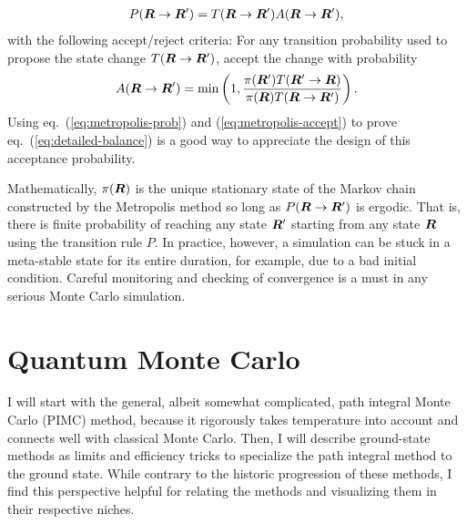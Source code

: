 \begin{align} \label{eq:metropolis-prob}
P(\boldsymbol{R}\rightarrow\boldsymbol{R}') = T(\boldsymbol{R}\rightarrow\boldsymbol{R}')A(\boldsymbol{R}\rightarrow\boldsymbol{R}'),
\end{align}
with the following accept/reject criteria: For any transition probability used to propose the state change $T(\boldsymbol{R}\rightarrow\boldsymbol{R}')$, accept the change with probability
\begin{align} \label{eq:metropolis-accept}
A(\boldsymbol{R}\rightarrow\boldsymbol{R}') = \min\left(1, \dfrac{\pi(\boldsymbol{R}')T(\boldsymbol{R}'\rightarrow\boldsymbol{R})}{\pi(\boldsymbol{R})T(\boldsymbol{R}\rightarrow\boldsymbol{R}')}\right).
\end{align}
Using eq.~(\ref{eq:metropolis-prob}) and (\ref{eq:metropolis-accept}) to prove eq.~(\ref{eq:detailed-balance}) is a good way to appreciate the design of this acceptance probability.

Mathematically, $\pi(\boldsymbol{R})$ is the unique stationary state of the Markov chain constructed by the Metropolis method so long as $P(\boldsymbol{R}\rightarrow\boldsymbol{R}')$ is ergodic. That is, there is finite probability of reaching any state $\boldsymbol{R}'$ starting from any state $\boldsymbol{R}$ using the transition rule $P$.
In practice, however, a simulation can be stuck in a meta-stable state for its entire duration, for example, due to a bad initial condition. Careful monitoring and checking of convergence is a must in any serious Monte Carlo simulation.

\section{Quantum Monte Carlo}

I will start with the general, albeit somewhat complicated, path integral Monte Carlo (PIMC) method, because it rigorously takes temperature into account and connects well with classical Monte Carlo. Then, I will describe ground-state methods as limits and efficiency tricks to specialize the path integral method to the ground state. While contrary to the historic progression of these methods, I find this perspective helpful for relating the methods and visualizing them in their respective niches.

